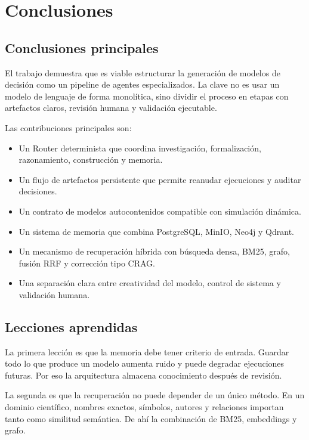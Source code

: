 \chapter{Conclusiones}

\section{Conclusiones principales}

El trabajo demuestra que es viable estructurar la generación de modelos de
decisión como un pipeline de agentes especializados. La clave no es usar un
modelo de lenguaje de forma monolítica, sino dividir el proceso en etapas con
artefactos claros, revisión humana y validación ejecutable.

Las contribuciones principales son:

\begin{itemize}
\item Un Router determinista que coordina investigación, formalización,
razonamiento, construcción y memoria.
\item Un flujo de artefactos persistente que permite reanudar ejecuciones y
auditar decisiones.
\item Un contrato de modelos autocontenidos compatible con simulación dinámica.
\item Un sistema de memoria que combina PostgreSQL, MinIO, Neo4j y Qdrant.
\item Un mecanismo de recuperación híbrida con búsqueda densa, BM25, grafo,
fusión RRF y corrección tipo CRAG.
\item Una separación clara entre creatividad del modelo, control de sistema y
validación humana.
\end{itemize}

\section{Lecciones aprendidas}

La primera lección es que la memoria debe tener criterio de entrada. Guardar todo
lo que produce un modelo aumenta ruido y puede degradar ejecuciones futuras. Por
eso la arquitectura almacena conocimiento después de revisión.

La segunda es que la recuperación no puede depender de un único método. En un
dominio científico, nombres exactos, símbolos, autores y relaciones importan
tanto como similitud semántica. De ahí la combinación de BM25, embeddings y
grafo.


